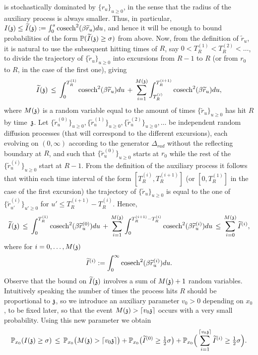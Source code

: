  is stochastically dominated by $\{r_u\}_{u\geq 0}$, in the sense that the radius of the auxiliary process is always smaller. Thus, in particular, $\II{\ss}\leq \tII{\ss} := \int_0^s\cosech^{2}(\beta \widetilde{r}_u)du$, and hence it will be enough to bound probabilities of the form $\PP(\tII{\ss}\geq\sigma)$ from above. Now, from the definition of $\widetilde{r}_u$, it is natural to use the subsequent hitting times of $R$, say $0<T_R^{(1)}<T_R^{(2)}<\ldots$, to divide the trajectory of $\{\widetilde{r}_u\}_{u\geq 0}$ into excursions from $R-1$ to $R$ (or from $r_0$ to $R$, in the case of the first one), giving
\[\tII{\ss}\,\leq\,\int_0^{T^{(1)}_R}\cosech^{2}(\beta\widetilde{r}_u)du\,+\,\sum_{i=1}^{M(\ss)}\int_{T^{(i)}_R}^{T^{(i+1)}_R}\cosech^{2}(\beta\widetilde{r}_u)du,\]
where $M(\ss)$ is a random variable equal to the amount of times $\{\widetilde{r}_u\}_{u\geq 0}$ has hit $R$ by time~$\ss$. Let $\{\widetilde{r}^{(0)}_u\}_{u\geq0},\{\widetilde{r}^{(1)}_u\}_{u\geq0},\{\widetilde{r}^{(2)}_u\}_{u\geq0},\ldots$ be independent random diffusion processes (that will correspond to the different excursions), each evolving on $(0,\infty)$ according to the generator $\Delta_{rad}$ without the reflecting boundary at $R$, and such that $\{\widetilde{r}^{(0)}_u\}_{u\geq0}$ starts at $r_0$ while the rest of the $\{\widetilde{r}^{(i)}_u\}_{u\geq0}$ start at $R-1$. From the definition of the auxiliary process it follows that within each time interval of the form $[T^{(i)}_R,T^{(i+1)}_R]$ (or $[0,T^{(1)}_R]$ in the case of the first excursion) the trajectory of $\{\widetilde{r}_u\}_{u\geq0}$ is equal to the one of $\{\widetilde{r}^{(i)}_{u'}\}_{u'\geq0}$ for $u'\leq T^{(i+1)}_R-T^{(i)}_R$. Hence,%
\[\tII{\ss}\,\leq\,\int_0^{T^{(1)}_R}\cosech^{2}(\beta\widetilde{r}^{(0)}_u)du\,+\,\sum_{i=1}^{M(\ss)}\int_{0}^{T^{(i+1)}_R-T^{(i)}_R}\cosech^{2}(\beta\widetilde{r}^{(i)}_u)du\,\leq\,\sum_{i=0}^{M(\ss)}\tI^{(i)},\]
where for $i=0, \ldots, M(\ss)$
\[\tI^{(i)}:=\int_{0}^{\infty}\cosech^{2}(\beta\widetilde{r}^{(i)}_u)du.\]
Observe that the bound on $\tII{\ss}$ involves a sum of $M(\ss)+1$ random variables. Intuitively speaking the number of times the process hits $R$ should be proportional to $\ss$, so we introduce an auxiliary parameter $v_0>0$ depending on $x_0$, to be fixed later, so that the event $M(\ss)>\lceil v_0\ss\rceil$ occurs with a very small probability. Using this new parameter we obtain
\begin{equation}\label{eq:division}\PP_{x_0}(\II{\ss}\geq\sigma)\,\leq\,\PP_{x_0}\big(M(\ss)>\lceil v_0\ss\rceil \big)+\PP_{x_0}\big(\tI^{(0)}\geq\tfrac12\sigma\big)+ \PP_{x_0}\Big(\sum_{i=1}^{\lceil v_0\ss\rceil}\tI^{(i)}\geq\tfrac12\sigma\Big).\end{equation}
